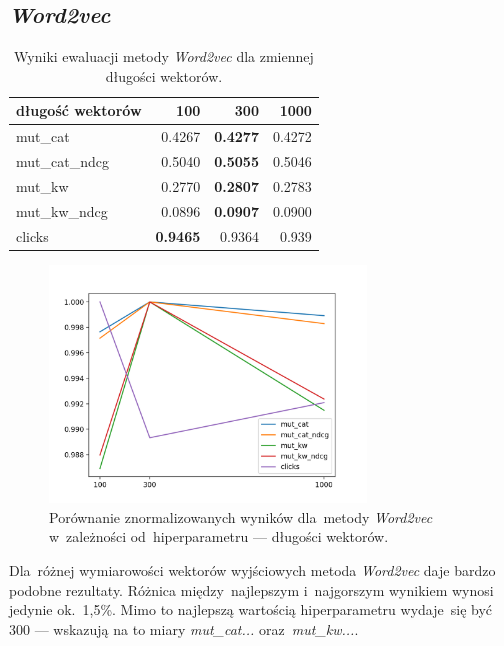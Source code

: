 \documentclass[pl]{minipw} %
\begin{document}
\subsection{\textit{Word2vec}}

\begin{table}[H]
	\centering
	\begin{tabular}{lrrr}
		\hline
		długość wektorów &       100 &       300 &      1000 \\
		\hline
		mut\_cat      & 0.4267 & \textbf{0.4277} & 0.4272 \\
		mut\_cat\_ndcg & 0.5040  & \textbf{0.5055} & 0.5046 \\
		mut\_kw       & 0.2770  & \textbf{0.2807} & 0.2783 \\
		mut\_kw\_ndcg  & 0.0896 & \textbf{0.0907} & 0.0900   \\
		clicks       & \textbf{0.9465} & 0.9364 & 0.939  \\
		\hline
	\end{tabular}
	\caption{Wyniki ewaluacji metody \textit{Word2vec} dla zmiennej długości wektorów.}
\end{table}

\begin{figure}[H]
	\centering
	\includegraphics[width=0.75\textwidth]{img/results/w2v_ctr.png}
	\caption{Porównanie znormalizowanych wyników dla~metody \textit{Word2vec} w~zależności od~hiperparametru --- długości wektorów.}
\end{figure}

Dla~różnej wymiarowości wektorów wyjściowych metoda \textit{Word2vec} daje bardzo podobne rezultaty. Różnica między~najlepszym i~najgorszym wynikiem wynosi jedynie ok.~1,5\%. Mimo to najlepszą wartością hiperparametru wydaje~się być 300 --- wskazują na to miary \textit{mut\_cat...} oraz~\textit{mut\_kw...}.
\end{document}
